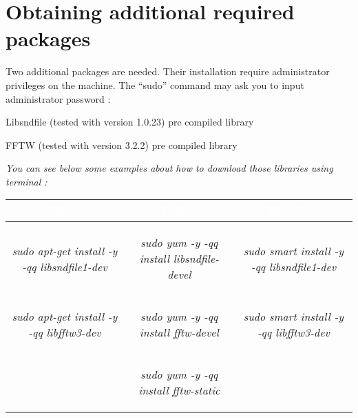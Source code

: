 \section{Obtaining additional required packages}

Two additional packages are needed. Their installation require administrator privileges on the machine. 
The ``sudo'' command may ask you to input administrator password :
\begin{my_itemize}
	\item Libsndfile (tested with version 1.0.23) pre compiled library
	\item FFTW (tested with version 3.2.2) pre compiled library
\end{my_itemize}

\noindent \emph{You can see below some examples about how to download those libraries using terminal :}

\vspace{0.3 cm}

\begin{tabular}{|c|c|c|}
	\hline
	\rowcolor[gray]{0.35} \textcolor{white}{\emph{Ubuntu}} &  \textcolor{white}{\emph{Fedora}} &  \textcolor{white}{\emph{Mandriva}} \\
	\hline \hline
		\begin{tiny}
			\emph{sudo apt-get install -y -qq libsndfile1-dev}
		\end{tiny}
		 & 
		 \begin{tiny}
		 	\emph{sudo yum -y -qq install libsndfile-devel}
		\end{tiny}
		& 
		\begin{tiny}
			\emph{sudo smart install -y -qq libsndfile1-dev}
		\end{tiny} \\
		\begin{tiny}
			\emph{sudo apt-get install -y -qq libfftw3-dev}
		\end{tiny}
		 & 
		 \begin{tiny}
		 	\emph{sudo yum -y -qq install fftw-devel}
		\end{tiny}
		& 
		\begin{tiny}
			\emph{sudo smart install -y -qq libfftw3-dev}
		\end{tiny} \\
		& 
		\begin{tiny}
			\emph{sudo yum -y -qq install fftw-static}
		\end{tiny}
		& \\
	\hline
\end{tabular}

